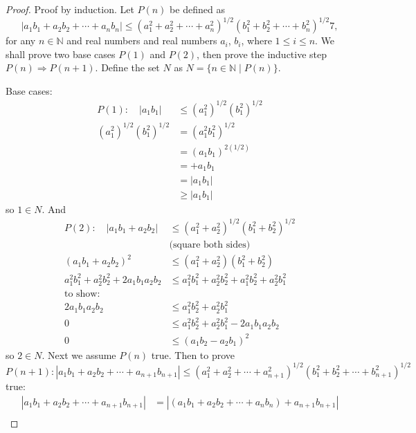 \documentclass[11pt,twoside, reqno, align]{amsart}
\theoremstyle{remark}
\def\N{\mathbb N}
\renewcommand{\implies}{\Rightarrow}
\begin{document}
\begin{proof}
Proof by induction. Let $P(n)$ be defined as
$$
|a_1b_1+a_2b_2+\cdots+a_nb_n|\leq (a_1^2+a_2^2+\cdots+a_n^2)^{1/2}(b_1^2+b_2^2+\cdots+b_n^2)^{1/2}7,
$$
for any $n \in \N$ and real numbers and real numbers $a_i$, $b_i$, where $1\leq i\leq n$. We shall prove two base cases $P(1)$ and $P(2)$, then prove the inductive step $P(n) \implies P(n+1)$. Define the set $N$ as $N = \{ n \in \N \mid P(n)\}$. 

Base cases:
\begin{align*}
    P(1): \quad |a_1b_1| & \leq (a_1^2)^{1/2}(b_1^2)^{1/2} \\
    (a_1^2)^{1/2}(b_1^2)^{1/2} & = (a_1^2b_1^2)^{1/2} \\
    & = (a_1b_1)^{2(1/2)} \\
    & = +a_1b_1 \\
    & = |a_1b_1| \\
    & \geq |a_1b_1|
\end{align*}
so $1 \in N$. And
\begin{align*}
    P(2): \quad |a_1b_1 + a_2b_2| & \leq (a_1^2 + a_2^2)^{1/2}(b_1^2 + b_2^2)^{1/2} \\
    & \text{(square both sides)} \\
    (a_1b_1 + a_2b_2)^2 & \leq  (a_1^2 + a_2^2)(b_1^2 + b_2^2) \\
    a_1^2b_1^2 + a_2^2b_2^2 + 2a_1b_1a_2b_2 & \leq a_1^2b_1^2 + a_2^2b_2^2 + a_1^2b_2^2 + a_2^2b_1^2 \\
    \text{to show:} \\
    2a_1b_1a_2b_2 & \leq a_1^2b_2^2 + a_2^2b_1^2 \\
    0 & \leq a_1^2b_2^2 + a_2^2b_1^2 - 2a_1b_1a_2b_2 \\
    0 & \leq (a_1b_2 - a_2b_1)^2
\end{align*}
so $2 \in N$. Next we assume $P(n)$ true. Then to prove $P(n+1): |a_1b_1+a_2b_2+\cdots+a_{n+1}b_{n+1}| \leq (a_1^2+a_2^2+\cdots+a_{n+1}^2)^{1/2}(b_1^2+b_2^2+\cdots+b_{n+1}^2)^{1/2}$ true:
\begin{align*}
    |a_1b_1+a_2b_2+ \cdots +a_{n+1}b_{n+1}| & = |(a_1b_1+a_2b_2+ \cdots +a_nb_n) + a_{n+1}b_{n+1}| \\

\end{align*}
\end{proof}
\end{document}
